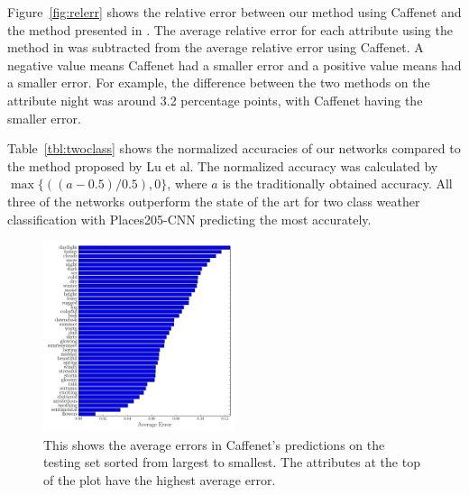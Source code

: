 \documentclass{article}
\newcommand{\figref}[1]{Figure~\ref{fig:#1}}
\newcommand{\tblref}[1]{Table~\ref{tbl:#1}}
\begin{document}
\figref{relerr} shows the relative error between our method using Caffenet
and the method presented in \cite{Laffont14}.  The average relative error 
for each attribute using the method in \cite{Laffont14} was subtracted from
the average relative error using Caffenet.  A negative value means Caffenet
had a smaller error and a positive value means \cite{Laffont14} had a smaller
error.  For example, the difference between the two methods on the attribute
night was around 3.2 percentage points, with Caffenet having the smaller 
error.

\tblref{twoclass} shows the normalized accuracies of our networks compared to 
the method proposed by Lu\cite{lutwoclass} et al.  The normalized accuracy was
calculated by $ \max\{((a - 0.5) / 0.5), 0\} $, where $a$ is the traditionally
obtained accuracy. All three of the networks outperform the state of the art for
two class weather classification with Places205-CNN predicting the most 
accurately.

 
 
%
%
%

\begin{figure}[t]
	\centering
		\includegraphics[width=0.5\textwidth]{figs/sorted_err_cmr.pdf}
		\caption{This shows the average errors in Caffenet's predictions on the 
						 testing set sorted from largest to smallest.  The attributes at 
						 the top of the plot have the highest average error.}
		\label{fig:sort}
\end{figure}
\end{document}
